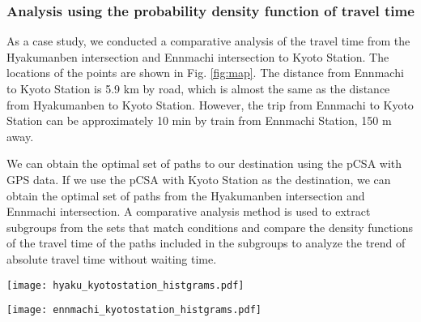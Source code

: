 \documentclass[conference]{IEEEtran}
\begin{document}
\subsubsection{Analysis using the probability density function of travel time}
\par As a case study, we conducted a comparative analysis of the travel time from the Hyakumanben intersection and Ennmachi intersection to Kyoto Station.
The locations of the points are shown in Fig. \ref{fig:map}.
The distance from Ennmachi to Kyoto Station is 5.9 km by road, which is almost the same as the distance from Hyakumanben to Kyoto Station.
However, the trip from Ennmachi to Kyoto Station can be approximately 10 min by train from Ennmachi Station, 150 m away.
\par We can obtain the optimal set of paths to our destination using the pCSA with GPS data.
If we use the pCSA with Kyoto Station as the destination, we can obtain the optimal set of paths from the Hyakumanben intersection and Ennmachi intersection.
A comparative analysis method is used to extract subgroups from the sets that match conditions and compare the density functions of the travel time of the paths included in the subgroups to analyze the trend of absolute travel time without waiting time.

\begin{figure*}[tb]
\begin{center}
\texttt{[image: hyaku\_kyotostation\_histgrams.pdf]}
\caption{A density function is formed for the travel time by classifying the sets of optimal paths for each condition for travel from Hyakumanben to Kyoto Station.
The horizontal axis is the travel time, and the vertical axis is the density.
In (a), the density function is formed for the February and April data.
The density function is formed for Kyoto citizens and visitors in (b), for weekdays and weekends in (c) and for departure time from 8:00 to 13:00 and from 13:00 to 18:00 in (d).
Note that since the data are based on GPS data, the travel time includes not only the effect of traffic congestion but the lag between the start/end of the trip and the time it is measured, as well as the waiting time.
}
		\label{fig:hyaku_histgrams}
	\end{center}
\end{figure*}

\begin{figure*}[tb]
\begin{center}
\texttt{[image: ennmachi\_kyotostation\_histgrams.pdf]}
\caption{A density function is formed for the travel time from Ennmachi to Kyoto Station by classifying sets of optimal paths for each condition.
The conditions in (a)-(d) are the same as in Fig. \ref{fig:hyaku_histgrams}.
By comparing this figure with Fig. \ref{fig:hyaku_histgrams}, the characteristics of the traffic in the section are clarified.
}
		\label{fig:ennmachi_histgrams}
	\end{center}
\end{figure*}
\end{document}
